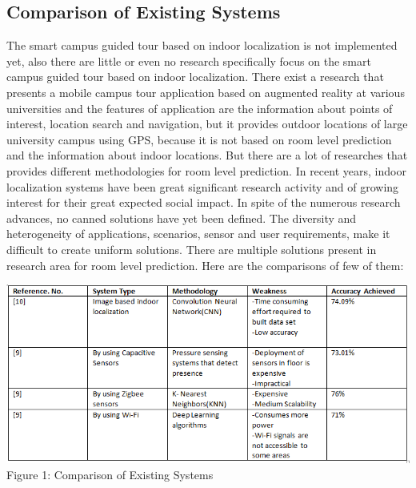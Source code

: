 \documentclass{article}
\begin{document}
\subsection{Comparison of Existing Systems}
The smart campus guided tour based on indoor localization is not implemented yet, also there are little or even no research specifically focus on the smart campus guided tour based on indoor localization. There exist a research that presents a mobile campus tour application based on augmented reality at various universities and the features of application are the information about points of interest, location search and navigation, but it provides outdoor locations of large university campus using GPS, because it is not based on room level prediction and the information about indoor locations. But there are a lot of researches that provides different methodologies for room level prediction. In recent years, indoor localization systems have been great significant research activity and of growing interest for their great expected social impact. In spite of the numerous research advances, no canned solutions have yet been defined. The diversity and heterogeneity of applications, scenarios, sensor and user requirements, make it difficult to create uniform solutions. There are multiple solutions present in research area for room level prediction. Here are the comparisons of few of them:


\begin{center}
\includegraphics[scale=0.8]{abc}
\\Figure 1: Comparison of Existing Systems
\label{fig:five}
\end{center}
\end{document}
